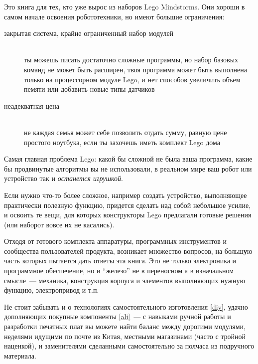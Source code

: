 \clearpage{}\secdown

\noindent
Это книга для тех, кто уже вырос из наборов Lego Mindstorms.
Они хороши в самом начале освоения робототехники, но имеют большие
ограничения:

\begin{description}

\item[закрытая система, крайне ограниченный набор модулей]\ \\ты можешь писать
достаточно сложные программы, но набор базовых команд не может быть расширен,
твоя программа может быть выполнена только на процессорном модуле Lego, и нет
способов увеличить объем пемяти или добавить новые типы датчиков

\item[неадекватная цена]\ \\не каждая семья может себе позволить отдать сумму,
равную цене простого ноутбука, если ты захочешь иметь комплект Lego дома

\end{description}
\clearpage

Самая главная проблема Lego: какой бы сложной не была ваша программа, какие бы
продвинутые алгоритмы вы не использовали, в реальном мире ваш робот или
устройство так и \textit{останется игрушкой}.


Если нужно что-то более сложное, например создать устройство, выполняющее
практически полезную функцию, придется сделать над собой небольшое усилие, и
освоить те вещи, для которых конструкторы Lego предлагали готовые решения (или
наборот вовсе их не касались).

Отходя от готового комплекта аппаратуры, программных инструментов и сообщества
пользователей продукта, возникает множество вопросов, на больш\textbf{у}ю часть
которых пытается дать ответы эта книга. Это не только электроника и программное
обеспечение, но и ``железо'' не в переносном а в изначальном смысле\ ---
механика, конструкция корпуса и элементов выполняющих нужную функцию,
электропривод и т.п.

Не стоит забывать и о технологиях самостоятельного изготовления \ref{diy},
удачно дополняющих покупные компоненты \ref{ali}\ --- с навыками ручной работы и
разработки печатных плат вы можете найти баланс между дорогими модулями,
неделями идущими по почте из Китая, местными магазинами (часто с тройной
наценкой), и заменителями сделанными самостоятельно за полчаса из подручного
материала.

\secup
